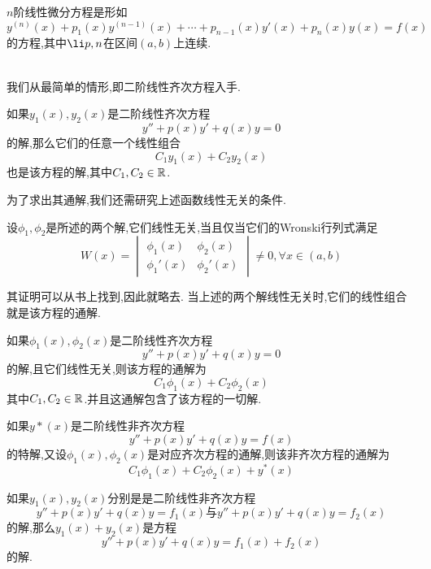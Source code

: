 \documentclass{ctexart}
\begin{document}
\pagestyle{empty}
\begin{center}\large{}\end{center}
\begin{definition}[0.1 定义:$n$阶线性微分方程]
    $n$阶线性微分方程是形如
    \[y^{(n)}(x)+p_1(x)y^{(n-1)}(x)+\cdots+p_{n-1}(x)y'(x)+p_{n}(x)y(x)=f(x)\]
    的方程,其中$\li p,n$在区间$(a,b)$上连续.
\end{definition}\noindent
{}\\
我们从最简单的情形,即二阶线性齐次方程入手.
\begin{formal}[1.1 二阶线性齐次方程的解]
    如果$y_1(x),y_2(x)$是二阶线性齐次方程
    \[y''+p(x)y'+q(x)y=0\]
    的解,那么它们的任意一个线性组合
    \[C_1y_1(x)+C_2y_2(x)\]
    也是该方程的解,其中$C_1,C_2\in\mathbb{R}$.
\end{formal}\noindent
为了求出其通解,我们还需研究上述函数线性无关的条件.
\begin{formal}[1.2 函数线性无关的充要条件]
    设$\phi_1,\phi_2$是所述的两个解,它们线性无关,当且仅当它们的Wronski行列式满足
    \[W(x)=\begin{vmatrix}
        \phi_1(x)&\phi_2(x)\\\phi_1'(x)&\phi_2'(x)
    \end{vmatrix}\neq0,\forall x\in(a,b)\]
\end{formal}\noindent
其证明可以从书上找到,因此就略去.%
当上述的两个解线性无关时,它们的线性组合就是该方程的通解.
\begin{formal}[1.3 二阶线性齐次方程的通解]
    如果$\phi_1(x),\phi_2(x)$是二阶线性齐次方程
    \[y''+p(x)y'+q(x)y=0\]
    的解,且它们线性无关,则该方程的通解为
    \[C_1\phi_1(x)+C_2\phi_2(x)\]
    其中$C_1,C_2\in\mathbb{R}$.并且这通解包含了该方程的一切解.
\end{formal}
\begin{formal}[1.4 二阶线性非齐次方程的通解]
    如果$y*(x)$是二阶线性非齐次方程
    \[y''+p(x)y'+q(x)y=f(x)\]
    的特解,又设$\phi_1(x),\phi_2(x)$是对应齐次方程的通解,则该非齐次方程的通解为
    \[C_1\phi_1(x)+C_2\phi_2(x)+y^*(x)\]
\end{formal}
\begin{formal}[1.5 二阶线性非齐次方程的加和性]
    如果$y_1(x),y_2(x)$分别是是二阶线性非齐次方程
    \[y''+p(x)y'+q(x)y=f_1(x)\text{与}y''+p(x)y'+q(x)y=f_2(x)\]
    的解,那么$y_1(x)+y_2(x)$是方程
    \[y''+p(x)y'+q(x)y=f_1(x)+f_2(x)\]
    的解.
\end{formal}
\noindent{}
\end{document}
